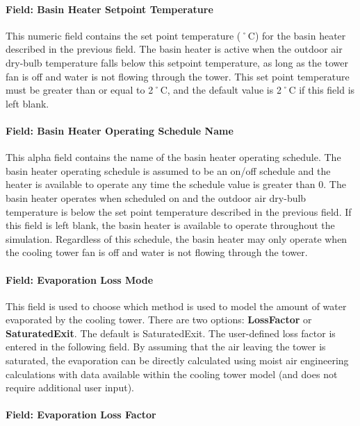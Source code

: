 \paragraph{Field: Basin Heater Setpoint Temperature}\label{field-basin-heater-setpoint-temperature-3}

This numeric field contains the set point temperature (˚C) for the basin heater described in the previous field. The basin heater is active when the outdoor air dry-bulb temperature falls below this setpoint temperature, as long as the tower fan is off and water is not flowing through the tower. This set point temperature must be greater than or equal to 2˚C, and the default value is 2˚C if this field is left blank.

\paragraph{Field: Basin Heater Operating Schedule Name}\label{field-basin-heater-operating-schedule-name-3}

This alpha field contains the name of the basin heater operating schedule. The basin heater operating schedule is assumed to be an on/off schedule and the heater is available to operate any time the schedule value is greater than 0. The basin heater operates when scheduled on and the outdoor air dry-bulb temperature is below the set point temperature described in the previous field. If this field is left blank, the basin heater is available to operate throughout the simulation. Regardless of this schedule, the basin heater may only operate when the cooling tower fan is off and water is not flowing through the tower.

\paragraph{Field: Evaporation Loss Mode}\label{field-evaporation-loss-mode-3}

This field is used to choose which method is used to model the amount of water evaporated by the cooling tower. There are two options: \textbf{LossFactor} or \textbf{SaturatedExit}. The default is SaturatedExit. The user-defined loss factor is entered in the following field. By assuming that the air leaving the tower is saturated, the evaporation can be directly calculated using moist air engineering calculations with data available within the cooling tower model (and does not require additional user input).

\paragraph{Field: Evaporation Loss Factor}\label{field-evaporation-loss-factor-3}

